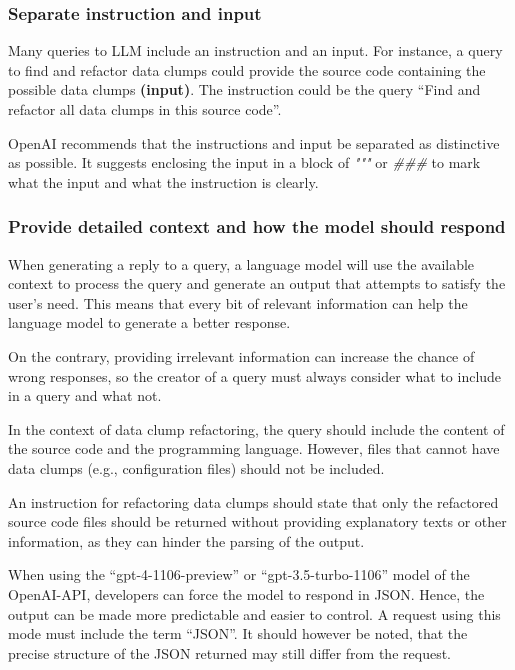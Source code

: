 \subsubsection{Separate instruction and input}
Many queries to \ac{LLM} include an instruction and an input. For instance, a query to find and refactor data clumps could provide the source code containing the possible data clumps \textbf{(input)}. The instruction could be the query \enquote{Find and refactor all data clumps in this source code}. 

OpenAI recommends that the instructions and input be separated as distinctive as possible. It suggests enclosing the input in a block of \textit{"""} or \textit{\#\#\#} to mark what the input and what the instruction is clearly.

\subsubsection{Provide detailed context and how the model should respond}

When generating a reply to a query, a language model will use the available context to process the query and generate an output that attempts to satisfy the user's need. This means that every bit of relevant information can help the language model to generate a better response.

On the contrary, providing irrelevant information can increase the chance of wrong responses, so the creator of a query must always consider what to include in a query and what not. 

In the context of data clump refactoring, the query should include the content of the source code and the programming language. However, files that cannot have data clumps (e.g., configuration files) should not be included.

An instruction for refactoring data clumps should state that only the refactored source code files should be returned without providing explanatory texts or other information, as they can hinder the parsing of the output. 

When using the \enquote{gpt-4-1106-preview} or \enquote{gpt-3.5-turbo-1106} model of the OpenAI-\ac{API}, developers can force the model to respond in \ac{JSON}. Hence, the output can be made more predictable and easier to control. A request using this mode must include the term \enquote{\ac{JSON}}. It should however be noted, that the precise structure of the \ac{JSON} returned may still differ from the request. 


